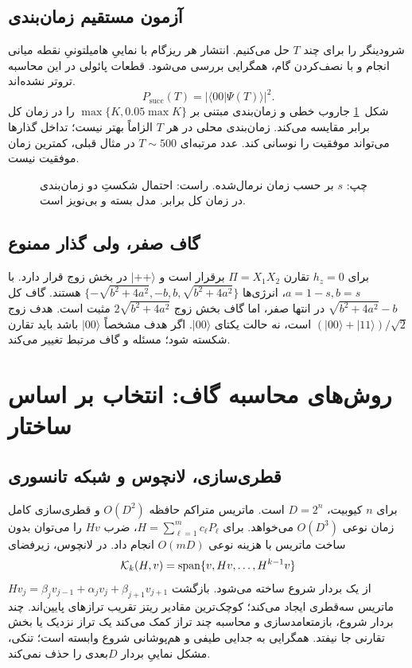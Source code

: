 \subsection{آزمون مستقیم زمان‌بندی}
شرودینگر را برای چند $T$ حل می‌کنیم. انتشار هر ریزگام با نماییِ هامیلتونیِ نقطه میانی انجام و با نصف‌کردن گام، همگرایی بررسی می‌شود. قطعات پائولی در این محاسبه تروتر نشده‌اند.
\begin{equation}
	P_{\mathrm{succ}}(T)=|\langle00|\Psi(T)\rangle|^2.
\end{equation}
شکل~\ref{fig:gap-schedule-test} جاروب خطی و زمان‌بندی مبتنی بر
$\max\{K,0.05\max K\}$ را در زمان کل برابر مقایسه می‌کند.
زمان‌بندی محلی در هر $T$ الزاماً بهتر نیست؛ تداخل گذارها می‌تواند موفقیت را نوسانی کند.
عدد مرتبه‌ای $T\sim500$ در مثال قبلی، کمترین زمان موفقیت نیست.
\begin{figure}[htbp]
	\centering
	\caption{چپ: $s$ بر حسب زمان نرمال‌شده. راست: احتمال شکستِ دو زمان‌بندی در زمان کل برابر. مدل بسته و بی‌نویز است.}
	\label{fig:gap-schedule-test}
\end{figure}

\subsection{گاف صفر، ولی گذار ممنوع}
برای $h_z=0$ تقارن $\Pi=X_1X_2$ برقرار است و $|++\rangle$ در بخش زوج قرار دارد.
با $a=1-s,b=s$، انرژی‌ها
$\{-\sqrt{b^2+4a^2},-b,b,\sqrt{b^2+4a^2}\}$ هستند.
گاف کل $\sqrt{b^2+4a^2}-b$ در انتها صفر، اما گاف بخش زوج
$2\sqrt{b^2+4a^2}$ مثبت است.
هدف زوج $(|00\rangle+|11\rangle)/\sqrt2$ است، نه حالت یکتای $|00\rangle$.
اگر هدف مشخصاً $|00\rangle$ باشد باید تقارن شکسته شود؛ مسئله و گاف مرتبط تغییر می‌کند.

\section{روش‌های محاسبه گاف: انتخاب بر اساس ساختار}
\label{sec:gap-methods}
\subsection{قطری‌سازی، لانچوس و شبکه تانسوری}
برای $n$ کیوبیت، $D=2^n$ است. ماتریس متراکم حافظه $O(D^2)$ و قطری‌سازی کامل زمان نوعی $O(D^3)$ می‌خواهد.
برای $H=\sum_{\ell=1}^m c_\ell P_\ell$، ضرب $Hv$ را می‌توان بدون ساخت ماتریس با هزینه نوعی $O(mD)$ انجام داد.
در لانچوس، زیرفضای
\begin{equation}
	{\cal K}_k(H,v)=\mathrm{span}\{v,Hv,\ldots,H^{k-1}v\}
\end{equation}
از یک بردار شروع ساخته می‌شود. بازگشت
$Hv_j=\beta_jv_{j-1}+\alpha_jv_j+\beta_{j+1}v_{j+1}$
ماتریس سه‌قطری ایجاد می‌کند؛ کوچک‌ترین مقادیر ریتز تقریب ترازهای پایین‌اند.
چند بردار شروع، بازمتعامدسازی و محاسبه چند تراز کمک می‌کند یک تراز نزدیک یا بخش تقارنی جا نیفتد.
همگرایی به جدایی طیفی و هم‌پوشانی شروع وابسته است؛ تنکی، مشکل نماییِ بردار $D$بعدی را حذف نمی‌کند.

